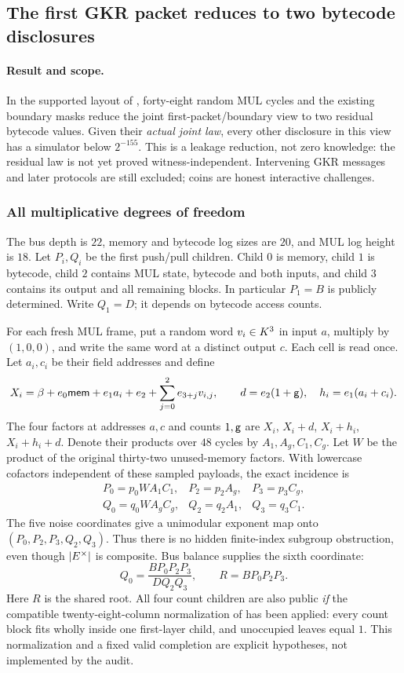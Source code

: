 \subsection{The first GKR packet reduces to two bytecode disclosures}\label{note:zk-gkr-first-packet}

\paragraph{Result and scope.} In the supported layout of , forty-eight random MUL cycles and the existing boundary masks reduce the joint first-packet/boundary view to two residual bytecode values. Given their \emph{actual joint law}, every other disclosure in this view has a simulator below $2^{-155}$. This is a leakage reduction, not zero knowledge: the residual law is not yet proved witness-independent. Intervening GKR messages and later protocols are still excluded; coins are honest interactive challenges.

\subsubsection{All multiplicative degrees of freedom}

The bus depth is $22$, memory and bytecode log sizes are $20$, and MUL log height is $18$. Let $P_i,Q_i$ be the first push/pull children. Child $0$ is memory, child $1$ is bytecode, child $2$ contains MUL state, bytecode and both inputs, and child $3$ contains its output and all remaining blocks. In particular $P_1=B$ is publicly determined. Write $Q_1=D$; it depends on bytecode access counts.

For each fresh MUL frame, put a random word $v_i\in K^3$ in input $a$, multiply by $(1,0,0)$, and write the same word at a distinct output $c$. Each cell is read once. Let $a_i,c_i$ be their field addresses and define
\[
 X_i=\beta+e_0\mathsf{mem}+e_1a_i+e_2+\sum_{j=0}^2e_{3+j}v_{i,j},
 \qquad d=e_2(1+\mathsf{g}),\quad h_i=e_1(a_i+c_i).
\]
The four factors at addresses $a,c$ and counts $1,\mathsf{g}$ are $X_i$, $X_i+d$, $X_i+h_i$, $X_i+h_i+d$. Denote their products over $48$ cycles by $A_1,A_g,C_1,C_g$. Let $W$ be the product of the original thirty-two unused-memory factors. With lowercase cofactors independent of these sampled payloads, the exact incidence is
\[
\begin{array}{lll}
 P_0=p_0WA_1C_1,&P_2=p_2A_g,&P_3=p_3C_g,\\
 Q_0=q_0WA_gC_g,&Q_2=q_2A_1,&Q_3=q_3C_1.
\end{array}
\]
The five noise coordinates give a unimodular exponent map onto $(P_0,P_2,P_3,Q_2,Q_3)$. Thus there is no hidden finite-index subgroup obstruction, even though $|E^\times|$ is composite. Bus balance supplies the sixth coordinate:
\[
 Q_0=\frac{BP_0P_2P_3}{DQ_2Q_3},\qquad
 R=BP_0P_2P_3.
\]
Here $R$ is the shared root. All four count children are also public \emph{if} the compatible twenty-eight-column normalization of  has been applied: every count block fits wholly inside one first-layer child, and unoccupied leaves equal $1$. This normalization and a fixed valid completion are explicit hypotheses, not implemented by the audit.

